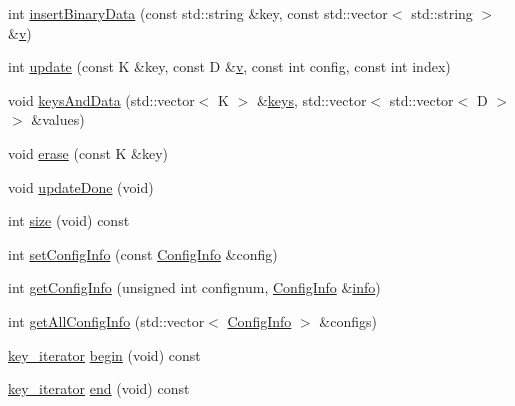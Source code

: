 \begin{DoxyCompactItemize}
\item 
int \mbox{\hyperlink{classFILEDB_1_1AllConfStoreDB_ac2c898624d4b32c526951edfb6271d60}{insert\+Binary\+Data}} (const std\+::string \&key, const std\+::vector$<$ std\+::string $>$ \&\mbox{\hyperlink{adat__devel_2lib_2hadron_2hadron__timeslice_8cc_a716fc87f5e814be3ceee2405ed6ff22a}{v}})
\item 
int \mbox{\hyperlink{classFILEDB_1_1AllConfStoreDB_a3beaa117f0ddf32de13d5f96643b626c}{update}} (const K \&key, const D \&\mbox{\hyperlink{adat__devel_2lib_2hadron_2hadron__timeslice_8cc_a716fc87f5e814be3ceee2405ed6ff22a}{v}}, const int config, const int index)
\item 
void \mbox{\hyperlink{classFILEDB_1_1AllConfStoreDB_a9150983c712d6b870a75886f92b10a9d}{keys\+And\+Data}} (std\+::vector$<$ K $>$ \&\mbox{\hyperlink{classFILEDB_1_1ConfDataStoreDB_a794e05e3888ab95e0396a196b5a18e65}{keys}}, std\+::vector$<$ std\+::vector$<$ D $>$ $>$ \&values)
\item 
void \mbox{\hyperlink{classFILEDB_1_1AllConfStoreDB_afb092d33f9ca14ca30918d6cb8251fdb}{erase}} (const K \&key)
\item 
void \mbox{\hyperlink{classFILEDB_1_1AllConfStoreDB_ac90e596f6c914145130719ec5ac13593}{update\+Done}} (void)
\item 
int \mbox{\hyperlink{classFILEDB_1_1AllConfStoreDB_a78dd830c5211b3b00b8eae6170ffc9d6}{size}} (void) const
\item 
int \mbox{\hyperlink{classFILEDB_1_1AllConfStoreDB_a2062f555d190a3c52cc942447a090b8a}{set\+Config\+Info}} (const \mbox{\hyperlink{classFILEDB_1_1ConfigInfo}{Config\+Info}} \&config)
\item 
int \mbox{\hyperlink{classFILEDB_1_1AllConfStoreDB_a351639b9e19297abfa7b8b1aca013770}{get\+Config\+Info}} (unsigned int confignum, \mbox{\hyperlink{classFILEDB_1_1ConfigInfo}{Config\+Info}} \&\mbox{\hyperlink{structinfo}{info}})
\item 
int \mbox{\hyperlink{classFILEDB_1_1AllConfStoreDB_aeb8e6daf1a1f9b7a19899cf7db365632}{get\+All\+Config\+Info}} (std\+::vector$<$ \mbox{\hyperlink{classFILEDB_1_1ConfigInfo}{Config\+Info}} $>$ \&configs)
\item 
\mbox{\hyperlink{classFILEDB_1_1AllConfStoreDB_a2ce8981ca7049ed0c2c6e438873a9c1b}{key\+\_\+iterator}} \mbox{\hyperlink{classFILEDB_1_1AllConfStoreDB_a7bb7f812d80471897860af5692eb5bd2}{begin}} (void) const
\item 
\mbox{\hyperlink{classFILEDB_1_1AllConfStoreDB_a2ce8981ca7049ed0c2c6e438873a9c1b}{key\+\_\+iterator}} \mbox{\hyperlink{classFILEDB_1_1AllConfStoreDB_a213c914b326e7769411e305ceb375b1d}{end}} (void) const
\end{DoxyCompactItemize}

